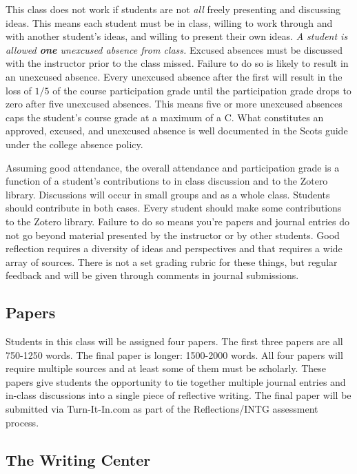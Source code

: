 \documentclass[nobib]{tufte-handout}
\begin{document}
This class does not work if students are not \textit{all} freely presenting and discussing ideas.  This means each student must be in class, willing to work through and with another student's ideas, and willing to present their own ideas.  \textit{A student is allowed \textbf{one} unexcused absence from class.} Excused absences must be discussed with the instructor prior to the class missed.  Failure to do so is likely to result in an unexcused absence.  Every unexcused absence after the first will result in the loss of $1/5$ of the course participation grade until the participation grade drops to zero after five unexcused absences. This means five or more unexcused absences caps the student's course grade at a maximum of a C. What constitutes an approved, excused, and unexcused absence is well documented in the Scots guide under the college absence policy.

Assuming good attendance, the overall attendance and participation grade is a function of a student's contributions to in class discussion and to the Zotero library.  Discussions will occur in small groups and as a whole class. Students should contribute in both cases. Every student should make some contributions to the Zotero library.  Failure to do so means you're papers and journal entries do not go beyond material presented by the instructor or by other students.  Good reflection requires a diversity of ideas and perspectives and that requires a wide array of sources. There is not a set grading rubric for these things, but regular feedback and will be given through comments in journal submissions.

\subsection{Papers}

Students in this class will be  assigned four papers. The first three papers are all 750-1250 words. The final paper is longer: 1500-2000 words. All four papers will require multiple sources and at least some of them must be scholarly. These papers give students the opportunity to tie together multiple journal entries and in-class discussions into a single piece of reflective writing. The final paper will be submitted via Turn-It-In.com as part of the Reflections/INTG assessment process.

\subsection{The Writing Center}
\end{document}
